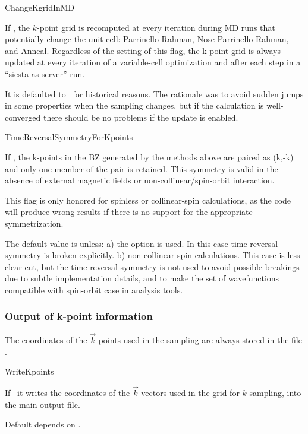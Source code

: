 \begin{fdflogicalF}{ChangeKgridInMD}

  If \fdftrue, the $k$-point grid is recomputed at every
  iteration during MD runs that potentially change the unit cell:
  Parrinello-Rahman, Nose-Parrinello-Rahman, and Anneal. Regardless of
  the setting of this flag, the k-point grid is always updated at
  every iteration of a variable-cell optimization and after each step
  in a ``siesta-as-server'' run.

  It is defaulted to \fdffalse\ for historical reasons. The rationale
  was to avoid sudden jumps in some properties when the sampling
  changes, but if the calculation is well-converged there should be no
  problems if the update is enabled.
  
\end{fdflogicalF}


\begin{fdflogicalT}{TimeReversalSymmetryForKpoints}

If \fdftrue, the k-points in the BZ generated by the methods above
are paired as (k,-k) and only one member of the pair is retained. This
symmetry is valid in the absence of external magnetic fields or
non-collinear/spin-orbit interaction.

This flag is only honored for spinless or collinear-spin calculations,
as the code will produce wrong results if there is no support for the
appropriate symmetrization.

The default value is \fdftrue unless: a) the option  
is used. In this case time-reversal-symmetry is broken explicitly. b)
non-collinear spin calculations. This case is less clear cut, but the
time-reversal symmetry is not used to avoid possible breakings due to
subtle implementation details, and to make the set of wavefunctions
compatible with spin-orbit case in analysis tools.



\end{fdflogicalT}


\subsubsection{Output of k-point information}

The coordinates of the $\vec k$ points used in the sampling
are always stored in the file .

\begin{fdflogicalF}{WriteKpoints}
  
  If \fdftrue\ it writes the coordinates of the $\vec k$ vectors used
  in the grid for $k$-sampling, into the main output file.
  
  Default depends on .

\end{fdflogicalF}



